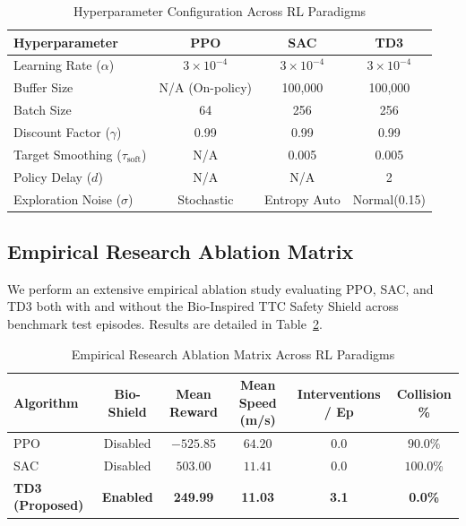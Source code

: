 \documentclass{svproc}
\begin{document}
\begin{table}[htbp]
\centering
\caption{Hyperparameter Configuration Across RL Paradigms}
\label{tab:hyperparams}
\setlength{\tabcolsep}{12pt}
\renewcommand{\arraystretch}{1.25}
\begin{tabular}{|l|c|c|c|}
\hline
\textbf{Hyperparameter} & \textbf{PPO} & \textbf{SAC} & \textbf{TD3} \\
\hline
Learning Rate ($\alpha$) & $3\times 10^{-4}$ & $3\times 10^{-4}$ & $3\times 10^{-4}$ \\
\hline
Buffer Size & N/A (On-policy) & 100,000 & 100,000 \\
\hline
Batch Size & 64 & 256 & 256 \\
\hline
Discount Factor ($\gamma$) & 0.99 & 0.99 & 0.99 \\
\hline
Target Smoothing ($\tau_{\text{soft}}$) & N/A & 0.005 & 0.005 \\
\hline
Policy Delay ($d$) & N/A & N/A & 2 \\
\hline
Exploration Noise ($\sigma$) & Stochastic & Entropy Auto & Normal(0.15) \\
\hline
\end{tabular}
\end{table}

\subsection{Empirical Research Ablation Matrix}
We perform an extensive empirical ablation study evaluating PPO, SAC, and TD3 both with and without the Bio-Inspired TTC Safety Shield across benchmark test episodes. Results are detailed in Table~\ref{tab:ablation_matrix}.

\begin{table}[htbp]
\centering
\caption{Empirical Research Ablation Matrix Across RL Paradigms}
\label{tab:ablation_matrix}
\setlength{\tabcolsep}{7pt}
\renewcommand{\arraystretch}{1.3}
\begin{tabular}{|l|c|c|c|c|c|}
\hline
\textbf{Algorithm} & \textbf{Bio-Shield} & \textbf{Mean Reward} & \textbf{Mean Speed (m/s)} & \textbf{Interventions / Ep} & \textbf{Collision \%} \\
\hline
PPO & Disabled & $-525.85$ & $64.20$ & $0.0$ & $90.0\%$ \\
\hline
SAC & Disabled & $503.00$ & $11.41$ & $0.0$ & $100.0\%$ \\
\hline
\textbf{TD3 (Proposed)} & \textbf{Enabled} & \textbf{249.99} & \textbf{11.03} & \textbf{3.1} & \textbf{0.0\%} \\
\hline
\end{tabular}
\end{table}
\end{document}
